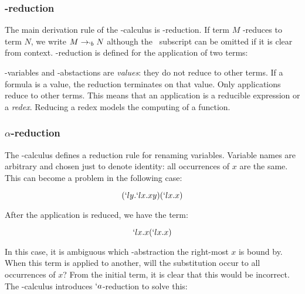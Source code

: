 \subsubsection{\bta-reduction}
  The main derivation rule of the \lam-calculus is \bta-reduction. If term
  $M$ \bta-reduces to term $N$, we write $M \rightarrow_{`b} N$ although 
  the \bta\ subscript can be omitted if it is clear from context. \bta-reduction
  is defined for the application of two terms:
  \begin{figure}[!h]\label{def:beta-reduction}
  \end{figure}
 
  \lam-variables and \lam-abstactions are \emph{values}: they do not reduce
  to other terms. If a formula is a value, the reduction terminates on that 
  value. Only applications reduce to other terms. This means that an 
  application is a reducible expression or a \emph{redex}. Reducing a 
  redex models the computing of a function. 

\subsubsection{$\alpha$-reduction}
  
  The \lam-calculus defines a reduction rule for renaming variables.
  Variable names are arbitrary and chosen just to denote identity:
  all occurrences of $x$ are the same. This can become a problem
  in the following case:
  
  \[
    (`ly.`lx.xy)(`lx.x)
  \]
 
  After the application is reduced, we have the term:
  
  \[
    `lx.x(`lx.x) 
  \]
  
  In this case, it is ambiguous which \lam-abstraction the right-most $x$
  is bound by. When this term is applied to another, will the substitution
  occur to all occurrences of $x$? From the initial term, it is clear that
  this would be incorrect. The \lam-calculus introduces $`a$-reduction to
  solve this:
  
  \begin{figure}[!h]\label{def:alpha-reduction}
  \end{figure}
  
